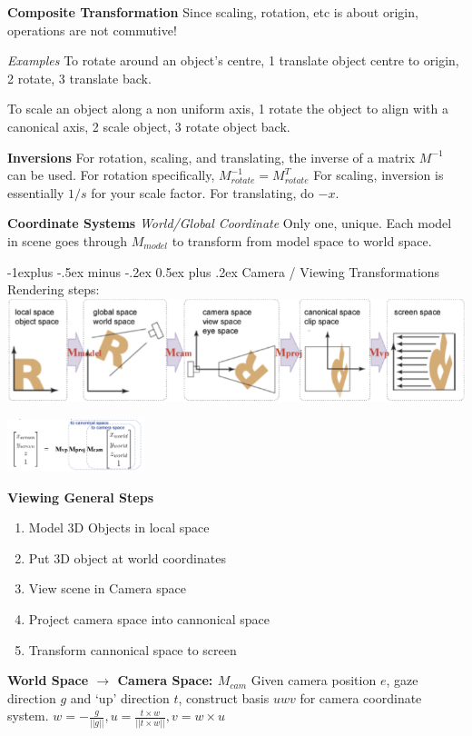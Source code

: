 \documentclass[letterpaper, 8pt]{extarticle}
\makeatletter
\renewcommand{\section}{\@startsection{section}{1}{0mm}%
                                {-1explus -.5ex minus -.2ex}%
                                {0.5ex plus .2ex}%
                                {\normalfont\normalsize\bfseries}}
\makeatother
\begin{document}
\begin{multicols*}{4}
\textbf{Composite Transformation}
Since scaling, rotation, etc is about origin, operations are not commutive!

\textit{Examples}
To rotate around an object's centre, 1 translate object centre to origin, 2 rotate, 3 translate back.

To scale an object along a non uniform axis, 1 rotate the object to align with a canonical axis, 2 scale object, 3 rotate object back.

\textbf{Inversions}
For rotation, scaling, and translating,
the inverse of a matrix \(M^{-1}\) can be used.
For rotation specifically, \(M^{-1}_{rotate}=M^T_{rotate}\)
For scaling, inversion is essentially \(1/s\) for your scale factor.
For translating, do \(-x\).

\textbf{Coordinate Systems}
\textit{World/Global Coordinate}
Only one, unique.
Each model in scene goes through \(M_{model}\) to transform from model space to world space.

\section{Camera / Viewing Transformations}
Rendering steps:
\includegraphics[width=\linewidth]{rendering-steps.png}

\includegraphics[width=4cm]{cam-total.png}

\textbf{Viewing General Steps}
\begin{enumerate}
    \item Model 3D Objects in local space
    \item Put 3D object at world coordinates
    \item View scene in Camera space
    \item Project camera space into cannonical space
    \item Transform cannonical space to screen
\end{enumerate}

\textbf{World Space $\to$ Camera Space: $M_{cam}$}
Given camera position $e$, gaze direction $g$ and `up' direction $t$, construct basis $uwv$ for camera coordinate system.
$w = - \frac{g}{||g||}, u = \frac{t \times w}{||t \times w||}, v = w \times u$


\end{multicols*}
\end{document}
